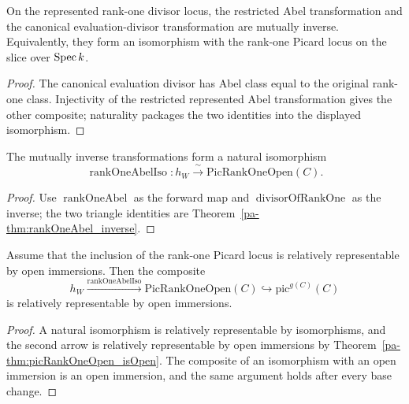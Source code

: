 \begin{theorem}
  \label{pa-thm:rankOneAbel_inverse}
  \leanok

  On the represented rank-one divisor locus, the restricted Abel transformation and the
  canonical evaluation-divisor transformation are mutually inverse.  Equivalently, they form
  an isomorphism with the rank-one Picard locus on the slice over \(\operatorname{Spec} k\).
\end{theorem}
\begin{proof}
  \leanok
  The canonical evaluation divisor has Abel class equal to the original rank-one class.
  Injectivity of the restricted represented Abel transformation gives the other composite;
  naturality packages the two identities into the displayed isomorphism.
\end{proof}

\begin{definition}
  \label{pa-def:rankOneAbelIso}
  \leanok

  The mutually inverse transformations form a natural isomorphism
  \[
    \operatorname{rankOneAbelIso}\colon
      h_W\xrightarrow{\ \sim\ }\mathrm{PicRankOneOpen}(C).
  \]
\end{definition}
\begin{proof}
  \leanok
  Use \(\operatorname{rankOneAbel}\) as the forward map and
  \(\operatorname{divisorOfRankOne}\) as the inverse; the two triangle identities are
  Theorem~\ref{pa-thm:rankOneAbel_inverse}.
\end{proof}

\begin{theorem}
  \label{pa-thm:rankOneAbel_isOpenImmersion}
  \leanok

  Assume that the inclusion of the rank-one Picard locus is relatively representable by
  open immersions.  Then the composite
  \[
    h_W\xrightarrow{\operatorname{rankOneAbelIso}}
    \mathrm{PicRankOneOpen}(C)\hookrightarrow\mathrm{pic}^{g(C)}(C)
  \]
  is relatively representable by open immersions.
\end{theorem}
\begin{proof}
  \leanok
  A natural isomorphism is relatively representable by isomorphisms, and the second arrow is
  relatively representable by open immersions by
  Theorem~\ref{pa-thm:picRankOneOpen_isOpen}.  The composite of an isomorphism with an open
  immersion is an open immersion, and the same argument holds after every base change.
\end{proof}

